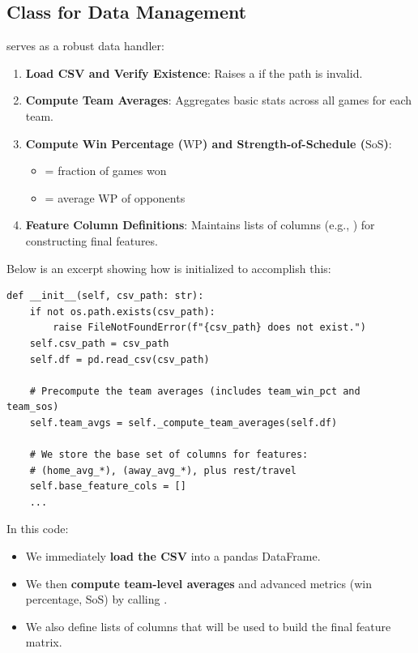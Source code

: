 \documentclass[12pt]{article}
\begin{document}
\subsection{Class  for Data Management}
 serves as a robust data handler:
\begin{enumerate}[label=\arabic*)]
    \item \textbf{Load CSV and Verify Existence}: Raises a  if the path is invalid.
    \item \textbf{Compute Team Averages}: Aggregates basic stats across all games for each team.
    \item \textbf{Compute Win Percentage (\(\text{WP}\)) and Strength-of-Schedule (\(\text{SoS}\))}: 
        \begin{itemize}[noitemsep]
            \item {} = fraction of games won
            \item {} = average WP of opponents
        \end{itemize}
    \item \textbf{Feature Column Definitions}: Maintains lists of columns (e.g., ) for constructing final features.
\end{enumerate}

Below is an excerpt showing how  is initialized to accomplish this:

\begin{verbatim}
def __init__(self, csv_path: str):
    if not os.path.exists(csv_path):
        raise FileNotFoundError(f"{csv_path} does not exist.")
    self.csv_path = csv_path
    self.df = pd.read_csv(csv_path)

    # Precompute the team averages (includes team_win_pct and team_sos)
    self.team_avgs = self._compute_team_averages(self.df)

    # We store the base set of columns for features:
    # (home_avg_*), (away_avg_*), plus rest/travel
    self.base_feature_cols = []
    ...
\end{verbatim}

\noindent
In this code:
\begin{itemize}
    \item We immediately \textbf{load the CSV} into a pandas DataFrame.
    \item We then \textbf{compute team-level averages} and advanced metrics (win percentage, SoS) by calling .
    \item We also define lists of columns that will be used to build the final feature matrix.
\end{itemize}
\end{document}
